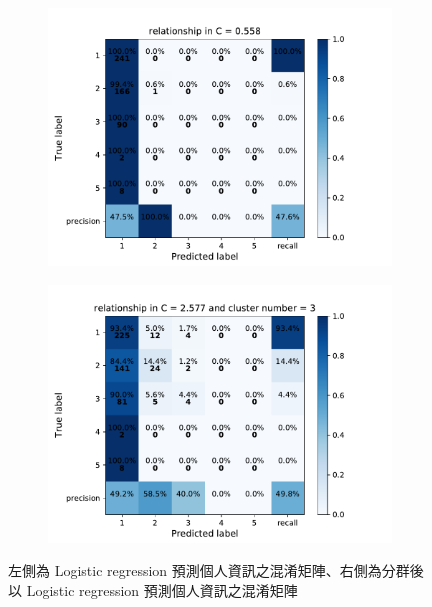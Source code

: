 {\begin{figure}[h]
    \centering
    \begin{subfigure}
      \centering
      \includegraphics[scale=0.45]{fig/super_lr_relationship.pdf}
    \end{subfigure}%
    \begin{subfigure}
      \centering
      \includegraphics[scale=0.45]{fig/kms_lr_relationship.pdf}
    \end{subfigure}
    \caption{左側為 Logistic regression 預測個人資訊之混淆矩陣、右側為分群後以 Logistic regression 預測個人資訊之混淆矩陣}
    \label{fig:lr_con}
\end{figure}

}
